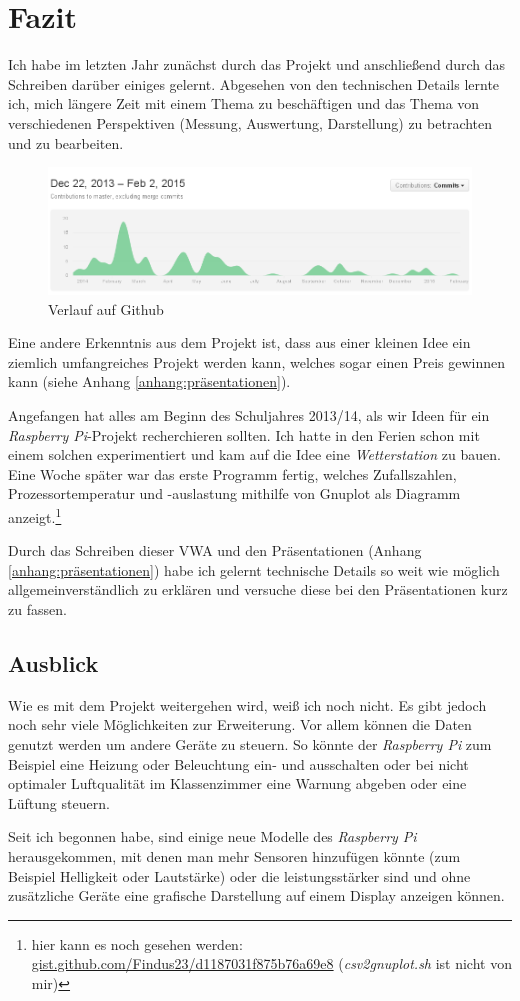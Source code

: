 \chapter{Fazit}
\label{cha:Fazit}
Ich habe im letzten Jahr zunächst durch das Projekt und anschließend durch das Schreiben darüber einiges gelernt. Abgesehen von den technischen Details lernte ich, mich längere Zeit mit einem Thema zu beschäftigen und das Thema von verschiedenen Perspektiven (Messung, Auswertung, Darstellung) zu betrachten und zu bearbeiten. 
\begin{figure}[h]
  \centering
     \includegraphics[width=\textwidth]{figures/Github_Umweltdatenmessung.png}
  \caption{Verlauf auf \gls{Github}}
  \label{fig:Github}
\end{figure}

Eine andere Erkenntnis aus dem Projekt ist, dass aus einer kleinen Idee ein ziemlich umfangreiches Projekt werden kann, welches sogar einen Preis gewinnen kann (siehe Anhang \ref{anhang:präsentationen}).

Angefangen hat alles am Beginn des Schuljahres 2013/14, als wir Ideen für ein \emph{Raspberry Pi}-Projekt recherchieren sollten. Ich hatte in den Ferien schon mit einem solchen experimentiert und kam auf die Idee eine \emph{Wetterstation} zu bauen. Eine Woche später war das erste Programm fertig, welches Zufallszahlen, Prozessortemperatur und -auslastung mithilfe von Gnuplot als Diagramm anzeigt.\footnote{hier kann es noch gesehen werden: \href{https://gist.github.com/Findus23/d1187031f875b76a69e8}{gist.github.com/Findus23/d1187031f875b76a69e8} (\emph{csv2gnuplot.sh} ist nicht von mir)}

Durch das Schreiben dieser VWA und den Präsentationen (Anhang \ref{anhang:präsentationen}) 
habe ich gelernt technische Details so weit wie möglich allgemeinverständlich zu erklären und  versuche diese bei den Präsentationen kurz zu fassen.

\section{Ausblick}
Wie es mit dem Projekt weitergehen wird, weiß ich noch nicht. Es gibt jedoch noch sehr viele Möglichkeiten zur Erweiterung. Vor allem können die Daten genutzt werden um andere Geräte zu steuern. So könnte der \emph{Raspberry Pi} zum Beispiel eine Heizung oder Beleuchtung ein- und ausschalten oder bei nicht optimaler Luftqualität im Klassenzimmer eine Warnung abgeben oder eine Lüftung steuern.

Seit ich begonnen habe, sind einige neue Modelle des \emph{Raspberry Pi} herausgekommen, mit denen man mehr Sensoren hinzufügen könnte (zum Beispiel Helligkeit oder Lautstärke) oder die leistungsstärker sind und ohne zusätzliche Geräte eine grafische Darstellung auf einem Display anzeigen können.